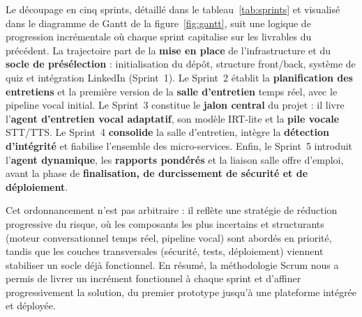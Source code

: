 Le découpage en cinq sprints, détaillé dans le tableau~\ref{tab:sprints} et visualisé dans le diagramme de Gantt de la figure~\ref{fig:gantt}, suit une logique de progression incrémentale où chaque sprint capitalise sur les livrables du précédent. La trajectoire part de la \textbf{mise en place} de l’infrastructure et du \textbf{socle de présélection} : initialisation du dépôt, structure front/back, système de quiz et intégration LinkedIn (Sprint~1). Le Sprint~2 établit la \textbf{planification des entretiens} et la première version de la \textbf{salle d’entretien} temps réel, avec le pipeline vocal initial. Le Sprint~3 constitue le \textbf{jalon central} du projet : il livre l’\textbf{agent d’entretien vocal adaptatif}, son modèle IRT-lite et la \textbf{pile vocale} STT/TTS. Le Sprint~4 \textbf{consolide} la salle d’entretien, intègre la \textbf{détection d’intégrité} et fiabilise l’ensemble des micro-services. Enfin, le Sprint~5 introduit l’\textbf{agent dynamique}, les \textbf{rapports pondérés} et la liaison salle\,\textrightarrow\,offre d’emploi, avant la phase de \textbf{finalisation, de durcissement de sécurité et de déploiement}.

Cet ordonnancement n’est pas arbitraire : il reflète une stratégie de réduction progressive du risque, où les composants les plus incertains et structurants (moteur conversationnel temps réel, pipeline vocal) sont abordés en priorité, tandis que les couches transversales (sécurité, tests, déploiement) viennent stabiliser un socle déjà fonctionnel. En résumé, la méthodologie Scrum nous a permis de livrer un incrément fonctionnel à chaque sprint et d’affiner progressivement la solution, du premier prototype jusqu’à une plateforme intégrée et déployée.

